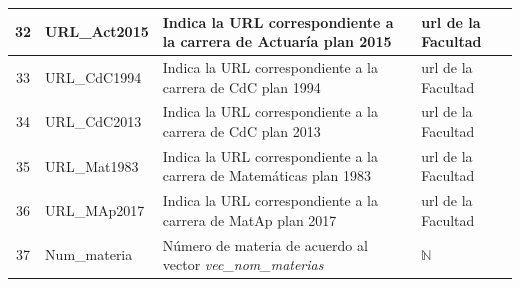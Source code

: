 {\begin{longtable}{|c|l|p{7cm}|p{2.6cm}|}
\hline 
32 & URL\_Act2015 & Indica la URL correspondiente a la carrera de Actuaría plan 2015 & url de la Facultad \\ 
\hline 
33 & URL\_CdC1994 & Indica la URL correspondiente a la carrera de CdC plan 1994 & url de la Facultad \\ 
\hline 
34 & URL\_CdC2013 & Indica la URL correspondiente a la carrera de CdC plan 2013 & url de la Facultad \\ 
\hline 
35 & URL\_Mat1983 & Indica la URL correspondiente a la carrera de Matemáticas plan 1983 & url de la Facultad \\ 
\hline 
36 & URL\_MAp2017 & Indica la URL correspondiente a la carrera de MatAp plan 2017 & url de la Facultad \\ 
\hline 
37 & Num\_materia & Número de materia de acuerdo al vector \textit{vec\_nom\_materias} & $\mathbb{N}$ \\ 
\hline 
\end{longtable}}


